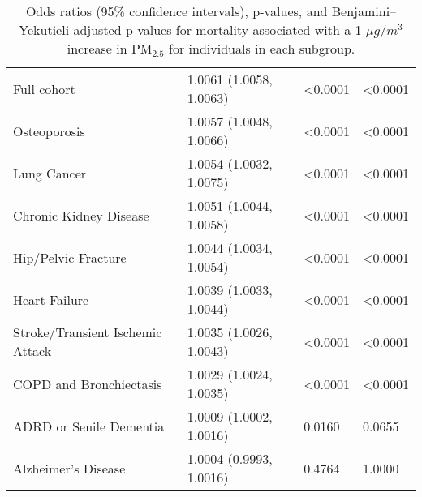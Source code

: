 \begin{table}[ht]
\begin{tabular}{llll}
  Full cohort & 1.0061 (1.0058, 1.0063) & \textless 0.0001 & \textless 0.0001 \\ 
  Osteoporosis & 1.0057 (1.0048, 1.0066) & \textless 0.0001 & \textless 0.0001 \\ 
  Lung Cancer & 1.0054 (1.0032, 1.0075) & \textless 0.0001 & \textless 0.0001 \\ 
  Chronic Kidney Disease & 1.0051 (1.0044, 1.0058) & \textless 0.0001 & \textless 0.0001 \\ 
  Hip/Pelvic Fracture & 1.0044 (1.0034, 1.0054) & \textless 0.0001 & \textless 0.0001 \\ 
  Heart Failure & 1.0039 (1.0033, 1.0044) & \textless 0.0001 & \textless 0.0001 \\ 
  Stroke/Transient Ischemic Attack & 1.0035 (1.0026, 1.0043) & \textless 0.0001 & \textless 0.0001 \\ 
  COPD and Bronchiectasis & 1.0029 (1.0024, 1.0035) & \textless 0.0001 & \textless 0.0001 \\ 
  ADRD or Senile Dementia & 1.0009 (1.0002, 1.0016) & 0.0160 & 0.0655 \\ 
  Alzheimer's Disease & 1.0004 (0.9993, 1.0016) & 0.4764 & 1.0000 \\ 
   \hline
\end{tabular}
\caption{Odds ratios (95\% confidence intervals), p-values, and Benjamini–Yekutieli
             adjusted p-values for mortality associated with a 1 \(\mu g/m^3\) increase in 
             PM\(_{2.5}\) for individuals in each subgroup.} 
\label{tab:subpop_effects}
\end{table}
